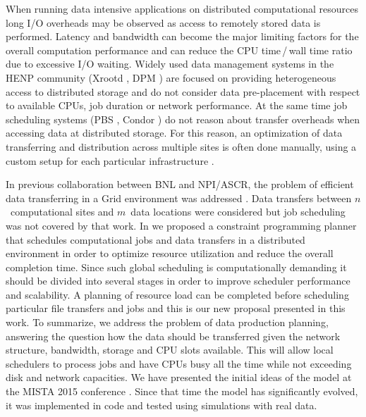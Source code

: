 \documentclass{svjour3}                     %
\begin{document}
When running data intensive applications on distributed computational
resources long I/O overheads may be observed as access to remotely stored data
is performed. Latency and bandwidth can become the major limiting factors for
the overall computation performance and can reduce the CPU time\,/\,wall time 
ratio due to excessive I/O waiting. 
Widely used data management systems in the HENP community
(Xrootd \cite{Xrootd}, DPM \cite{DPM}) are focused on providing heterogeneous access to distributed
storage and do not consider data pre-placement with respect to available CPUs,
job duration or network performance. At the same time job scheduling systems
(PBS \cite{PBS}, Condor \cite{Torque}) do not reason about transfer overheads when accessing data at
distributed storage. For this reason, an optimization of data transferring and
distribution across multiple sites is often done manually, using a custom
setup for each particular infrastructure \cite{Balewski}. 

In previous collaboration between BNL and NPI/ASCR, the problem of
efficient data transferring in a Grid environment was addressed \cite{Zerola}.
Data transfers between $n$~computational sites and $m$~data locations were
considered but job scheduling was not covered
by that work. In \cite{ACAT_cp} we
proposed a constraint programming planner that schedules computational jobs
and data transfers in a distributed environment in order to optimize resource
utilization and reduce the overall completion time. Since such global
scheduling is computationally demanding it should be divided into several
stages in order to improve scheduler performance and scalability. A planning of
resource load can be completed before scheduling particular file
transfers and jobs and this is our new proposal presented in this work. To summarize, we address the problem of data production
planning, answering the question how the data should be transferred given the
network structure, bandwidth, storage and CPU slots available. This will allow
local schedulers to process jobs and have CPUs busy all the time while not
exceeding disk and network capacities. 
We have presented the initial ideas of the model at the MISTA 2015 conference \cite{MISTA}. Since that time the model has significantly evolved, it was implemented in code and tested using simulations with real data. 
\end{document}
